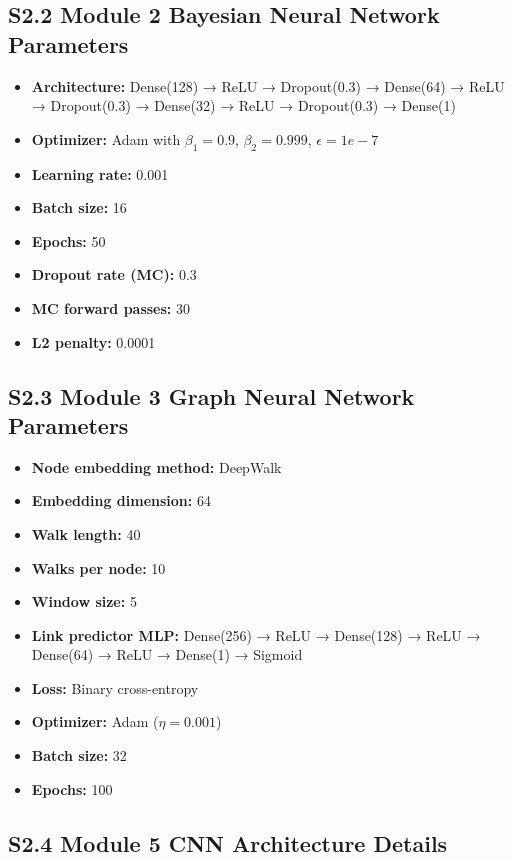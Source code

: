 \documentclass[11pt,a4paper]{article}
\begin{document}
\subsection{S2.2 Module 2 Bayesian Neural Network Parameters}

\begin{itemize}
    \item \textbf{Architecture:} Dense(128) → ReLU → Dropout(0.3) → Dense(64) → ReLU → Dropout(0.3) → Dense(32) → ReLU → Dropout(0.3) → Dense(1)
    \item \textbf{Optimizer:} Adam with $\beta_1=0.9$, $\beta_2=0.999$, $\epsilon=1e-7$
    \item \textbf{Learning rate:} 0.001
    \item \textbf{Batch size:} 16
    \item \textbf{Epochs:} 50
    \item \textbf{Dropout rate (MC):} 0.3
    \item \textbf{MC forward passes:} 30
    \item \textbf{L2 penalty:} 0.0001
\end{itemize}

\subsection{S2.3 Module 3 Graph Neural Network Parameters}

\begin{itemize}
    \item \textbf{Node embedding method:} DeepWalk
    \item \textbf{Embedding dimension:} 64
    \item \textbf{Walk length:} 40
    \item \textbf{Walks per node:} 10
    \item \textbf{Window size:} 5
    \item \textbf{Link predictor MLP:} Dense(256) → ReLU → Dense(128) → ReLU → Dense(64) → ReLU → Dense(1) → Sigmoid
    \item \textbf{Loss:} Binary cross-entropy
    \item \textbf{Optimizer:} Adam ($\eta = 0.001$)
    \item \textbf{Batch size:} 32
    \item \textbf{Epochs:} 100
\end{itemize}

\subsection{S2.4 Module 5 CNN Architecture Details}
\end{document}
